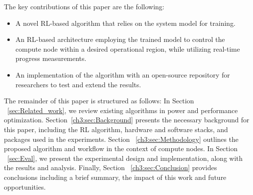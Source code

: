 The key contributions of this paper are the following:
\begin{itemize}
\item A novel RL-based algorithm that relies on the system model for training.
\item An RL-based architecture employing the trained model to control the compute node within a desired operational region, while utilizing real-time progress measurements.
\item An implementation of the algorithm with an open-source repository for researchers to test and extend the results.
\end{itemize}

The remainder of this paper is structured as follows: In Section ~\ref{sec:Related_work}, we review existing algorithms in power and performance optimization. Section~\ref{ch3:sec:Background} presents the necessary background for this paper, including the RL algorithm, hardware and software stacks, and packages used in the experiments. Section ~\ref{ch3:sec:Methodology} outlines the proposed algorithm and workflow in the context of compute nodes. In Section ~\ref{sec:Eval}, we present the experimental design and implementation, along with the results and analysis. Finally, Section ~\ref{ch3:sec:Conclusion} provides conclusions including a brief summary, the impact of this work and future opportunities. 



